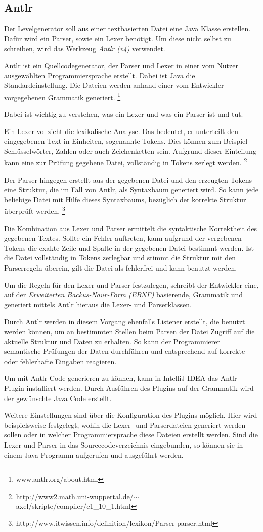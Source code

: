 \subsection{Antlr}

Der Levelgenerator soll aus einer textbasierten Datei eine Java Klasse erstellen. Dafür wird ein Parser, sowie ein Lexer benötigt. Um diese nicht selbst zu schreiben, wird das Werkzeug \textit{Antlr (v4)} verwendet.

Antlr ist ein Quellcodegenerator, der Parser und Lexer in einer vom Nutzer ausgewählten Programmiersprache erstellt. Dabei ist Java die Standardeinstellung. Die Dateien werden anhand einer vom Entwickler vorgegebenen Grammatik generiert. \footnote{www.antlr.org/about.html} 

Dabei ist wichtig zu verstehen, was ein Lexer und was ein Parser ist und tut. 

Ein Lexer vollzieht die lexikalische Analyse. Das bedeutet, er unterteilt den eingegebenen Text in Einheiten, sogenannte Tokens. Dies können zum Beispiel Schlüsselwörter, Zahlen oder auch Zeichenketten sein. Aufgrund dieser Einteilung kann eine zur Prüfung gegebene Datei, vollständig in Tokens zerlegt werden. 
\footnote{http://www2.math.uni-wuppertal.de/$\sim$axel/skripte/compiler/c1\_10\_1.html} 

Der Parser hingegen erstellt aus der gegebenen Datei und den erzeugten Tokens eine Struktur, die im Fall von Antlr, als Syntaxbaum generiert wird. So kann jede beliebige Datei mit Hilfe dieses Syntaxbaums, bezüglich der korrekte Struktur überprüft werden. \footnote{http://www.itwissen.info/definition/lexikon/Parser-parser.html}

Die Kombination aus Lexer und Parser ermittelt die syntaktische Korrektheit des gegebenen Textes. Sollte ein Fehler auftreten, kann aufgrund der vergebenen Tokens die exakte Zeile und Spalte in der gegebenen Datei bestimmt werden. Ist die Datei vollständig in Tokens zerlegbar und stimmt die Struktur mit den Parserregeln überein, gilt die Datei als fehlerfrei und kann benutzt werden.

Um die Regeln für den Lexer und Parser festzulegen, schreibt der Entwickler eine, auf der \textit{Erweiterten Backus-Naur-Form (EBNF)} basierende, Grammatik und generiert mittels Antlr hieraus die Lexer- und Parserklassen.

Durch Antlr werden in diesem Vorgang ebenfalls Listener erstellt, die benutzt werden können, um an bestimmten Stellen beim Parsen der Datei Zugriff auf die aktuelle Struktur und Daten zu erhalten. So kann der Programmierer semantische Prüfungen der Daten durchführen und entsprechend auf korrekte oder fehlerhafte Eingaben reagieren.

Um mit Antlr Code generieren zu können, kann in IntelliJ IDEA das Antlr Plugin installiert werden. Durch Ausführen des Plugins auf der Grammatik wird der gewünschte Java Code erstellt.

Weitere Einstellungen sind über die Konfiguration des Plugins möglich. Hier wird beispielsweise festgelegt, wohin die Lexer- und Parserdateien generiert werden sollen oder in welcher Programmiersprache diese Dateien erstellt werden. 
Sind die Lexer und Parser in das Sourcecodeverzeichnis eingebunden, so können sie in einem Java Programm aufgerufen und ausgeführt werden.
